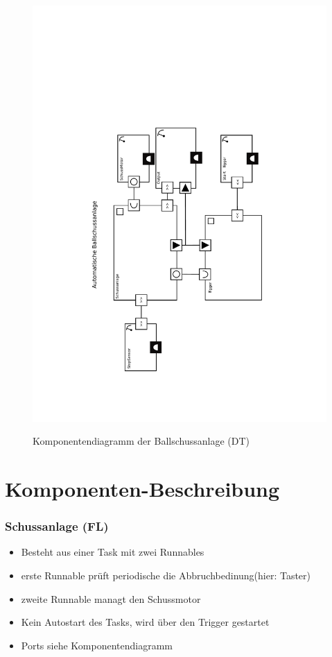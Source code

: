 \documentclass[a4paper,11pt]{scrreprt}
\begin{document}
\begin{figure}[htbp]
 \centering
 \includegraphics[scale=.75]{./KomponentenDiagramm.pdf}
 \label{fig:komponentendiag}
 \caption{Komponentendiagramm der Ballschussanlage (DT)}
\end{figure}

\chapter{Komponenten-Beschreibung}

\subsection*{Schussanlage (FL)}

\begin{itemize}
	\item Besteht aus einer Task mit zwei Runnables
	\item erste Runnable prüft periodische die Abbruchbedinung(hier: Taster)
	\item zweite Runnable managt den Schussmotor
	\item Kein Autostart des Tasks, wird über den Trigger gestartet
	\item Ports siehe Komponentendiagramm
\end{itemize}
\end{document}
